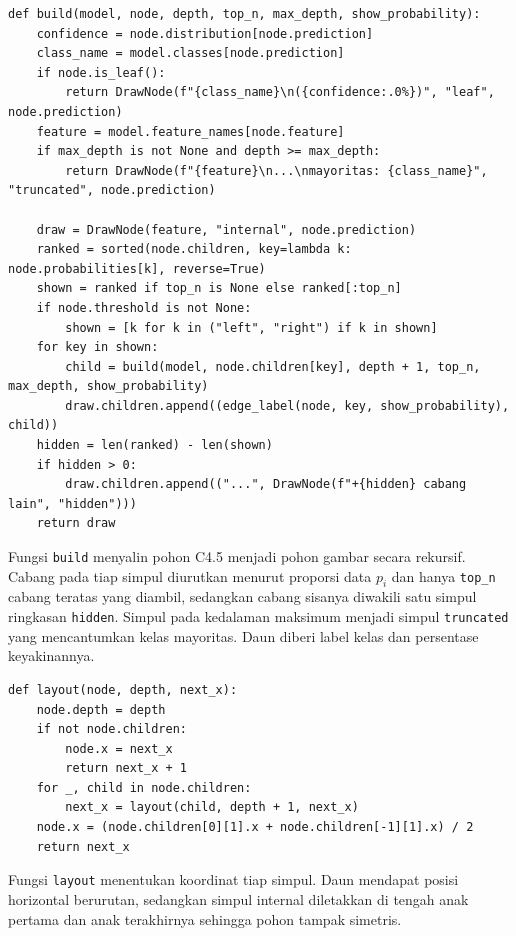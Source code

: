 \begin{lstlisting}
def build(model, node, depth, top_n, max_depth, show_probability):
    confidence = node.distribution[node.prediction]
    class_name = model.classes[node.prediction]
    if node.is_leaf():
        return DrawNode(f"{class_name}\n({confidence:.0%})", "leaf", node.prediction)
    feature = model.feature_names[node.feature]
    if max_depth is not None and depth >= max_depth:
        return DrawNode(f"{feature}\n...\nmayoritas: {class_name}", "truncated", node.prediction)

    draw = DrawNode(feature, "internal", node.prediction)
    ranked = sorted(node.children, key=lambda k: node.probabilities[k], reverse=True)
    shown = ranked if top_n is None else ranked[:top_n]
    if node.threshold is not None:
        shown = [k for k in ("left", "right") if k in shown]
    for key in shown:
        child = build(model, node.children[key], depth + 1, top_n, max_depth, show_probability)
        draw.children.append((edge_label(node, key, show_probability), child))
    hidden = len(ranked) - len(shown)
    if hidden > 0:
        draw.children.append(("...", DrawNode(f"+{hidden} cabang lain", "hidden")))
    return draw
\end{lstlisting}

Fungsi \texttt{build} menyalin pohon C4.5 menjadi pohon gambar secara
rekursif. Cabang pada tiap simpul diurutkan menurut proporsi data $p_i$ dan
hanya \texttt{top\_n} cabang teratas yang diambil, sedangkan cabang sisanya
diwakili satu simpul ringkasan \texttt{hidden}. Simpul pada kedalaman maksimum
menjadi simpul \texttt{truncated} yang mencantumkan kelas mayoritas. Daun diberi
label kelas dan persentase keyakinannya.

\begin{lstlisting}
def layout(node, depth, next_x):
    node.depth = depth
    if not node.children:
        node.x = next_x
        return next_x + 1
    for _, child in node.children:
        next_x = layout(child, depth + 1, next_x)
    node.x = (node.children[0][1].x + node.children[-1][1].x) / 2
    return next_x
\end{lstlisting}

Fungsi \texttt{layout} menentukan koordinat tiap simpul. Daun mendapat posisi
horizontal berurutan, sedangkan simpul internal diletakkan di tengah anak
pertama dan anak terakhirnya sehingga pohon tampak simetris.

